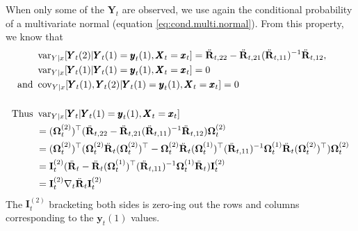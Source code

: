 \documentclass[]{article}
\def\OMG{\mbox{\boldmath $\Omega$}}
\def\IIm{\mbox{$\mathbf I$}}
\def\RR{\mbox{$\mathbf R$}}	 \def\rr{\mbox{$\mathbf r$}} \def\Rb{\mbox{$\mathbf H$}}	\def\Rm{\mathbb{R}}
\def\XX{\mbox{$\pmb{X}$}}	\def\xx{\mbox{$\pmb{x}$}}
\def\YY{\mbox{$\pmb{Y}$}}	\def\yy{\mbox{$\pmb{y}$}}
\def\var{\,\textup{\textrm{var}}}
\def\cov{\,\textup{\textrm{cov}}}
\def\IR{\nabla}
\begin{document}
When only some of the $\YY_t$ are observed, we use again the conditional probability of a multivariate normal (equation \ref{eq:cond.multi.normal}).  From this property, we know that 
\begin{equation}\label{eq:var.Y.cond.x}
\begin{split}
&\var_{Y|x}[\YY_t(2)|\YY_t(1)=\yy_t(1),\XX_t=\xx_t]=\ddot{\RR}_{t,22} - \ddot{\RR}_{t,21}(\ddot{\RR}_{t,11})^{-1}\ddot{\RR}_{t,12},\\
&\var_{Y|x}[\YY_t(1)|\YY_t(1)=\yy_t(1),\XX_t=\xx_t]=0\\
\text{and }&\cov_{Y|x}[\YY_t(1),\YY_t(2)|\YY_t(1)=\yy_t(1),\XX_t=\xx_t]=0\\
\\
\text{Thus }&\var_{Y|x}[\YY_t|\YY_t(1)=\yy_t(1),\XX_t=\xx_t]\\
&=(\OMG_t^{(2)})^\top(\ddot{\RR}_{t,22} - \ddot{\RR}_{t,21}(\ddot{\RR}_{t,11})^{-1}\ddot{\RR}_{t,12})\OMG_t^{(2)}\\
&=(\OMG_t^{(2)})^\top(\OMG_t^{(2)}\ddot{\RR}_t(\OMG_t^{(2)})^\top - \OMG_t^{(2)}\ddot{\RR}_t(\OMG_t^{(1)})^\top(\ddot{\RR}_{t,11})^{-1}\OMG_t^{(1)}\ddot{\RR}_t(\OMG_t^{(2)})^\top)\OMG_t^{(2)}\\
&=\IIm_t^{(2)}(\ddot{\RR}_t-\ddot{\RR}_t(\OMG_t^{(1)})^\top(\ddot{\RR}_{t,11})^{-1}\OMG_t^{(1)}\ddot{\RR}_t)\IIm_t^{(2)}\\
&=\IIm_t^{(2)}\IR_t\ddot{\RR}_t\IIm_t^{(2)}
\end{split}
\end{equation}
The $\IIm_t^{(2)}$ bracketing both sides is zero-ing out the rows and columns corresponding to the $\yy_t(1)$ values.
\end{document}
